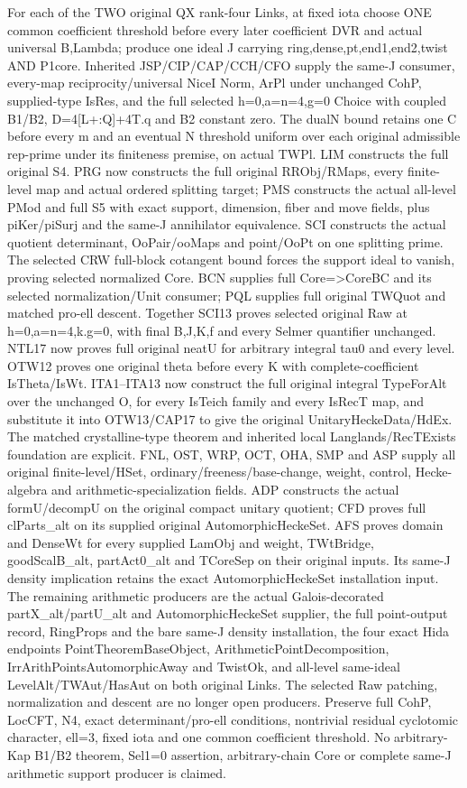 \documentclass[11pt,a4paper]{article}
\numberwithin{equation}{section}
\theoremstyle{remark}\newtheorem{remark}[theorem]{Remark}
\begin{document}
For each of the TWO original QX rank-four Links, at fixed iota choose ONE common coefficient threshold before every later coefficient DVR and actual universal B,Lambda; produce one ideal J carrying ring,dense,pt,end1,end2,twist AND P1core. Inherited JSP/CIP/CAP/CCH/CFO supply the same-J consumer, every-map reciprocity/universal NiceI Norm, ArPl under unchanged CohP, supplied-type IsRes, and the full selected h=0,a=n=4,g=0 Choice with coupled B1/B2, D=4[L+:Q]+4T.q and B2 constant zero. The dualN bound retains one C before every m and an eventual N threshold uniform over each original admissible rep-prime under its finiteness premise, on actual TWPl. LIM constructs the full original S4. PRG now constructs the full original RRObj/RMaps, every finite-level map and actual ordered splitting target; PMS constructs the actual all-level PMod and full S5 with exact support, dimension, fiber and move fields, plus piKer/piSurj and the same-J annihilator equivalence. SCI constructs the actual quotient determinant, OoPair/ooMaps and point/OoPt on one splitting prime. The selected CRW full-block cotangent bound forces the support ideal to vanish, proving selected normalized Core. BCN supplies full Core=>CoreBC and its selected normalization/Unit consumer; PQL supplies full original TWQuot and matched pro-ell descent. Together SCI13 proves selected original Raw at h=0,a=n=4,k.g=0, with final B,J,K,f and every Selmer quantifier unchanged. NTL17 now proves full original neatU for arbitrary integral tau0 and every level. OTW12 proves one original theta before every K with complete-coefficient IsTheta/IsWt. ITA1–ITA13 now construct the full original integral TypeForAlt over the unchanged O, for every IsTeich family and every IsRecT map, and substitute it into OTW13/CAP17 to give the original UnitaryHeckeData/HdEx. The matched crystalline-type theorem and inherited local Langlands/RecTExists foundation are explicit. FNL, OST, WRP, OCT, OHA, SMP and ASP supply all original finite-level/HSet, ordinary/freeness/base-change, weight, control, Hecke-algebra and arithmetic-specialization fields. ADP constructs the actual formU/decompU on the original compact unitary quotient; CFD proves full clParts\_\allowbreak alt on its supplied original AutomorphicHeckeSet. AFS proves domain and DenseWt for every supplied LamObj and weight, TWtBridge, goodScalB\_\allowbreak alt, partAct0\_\allowbreak alt and TCoreSep on their original inputs. Its same-J density implication retains the exact AutomorphicHeckeSet installation input. The remaining arithmetic producers are the actual Galois-decorated partX\_\allowbreak alt/partU\_\allowbreak alt and AutomorphicHeckeSet supplier, the full point-output record, RingProps and the bare same-J density installation, the four exact Hida endpoints PointTheoremBaseObject, ArithmeticPointDecomposition, IrrArithPointsAutomorphicAway and TwistOk, and all-level same-ideal LevelAlt/TWAut/HasAut on both original Links. The selected Raw patching, normalization and descent are no longer open producers. Preserve full CohP, LocCFT, N4, exact determinant/pro-ell conditions, nontrivial residual cyclotomic character, ell=3, fixed iota and one common coefficient threshold. No arbitrary-Kap B1/B2 theorem, Sel1=0 assertion, arbitrary-chain Core or complete same-J arithmetic support producer is claimed.
\end{document}
